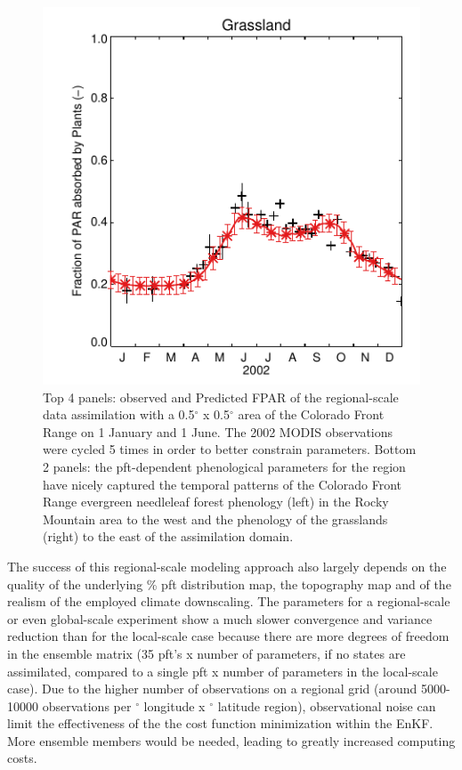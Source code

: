\documentclass[a4paper,12pt]{article}
\newcommand{\degree}{$^{\circ}$ }
\begin{document}
\begin{figure}[hp]
\begin{center}
\includegraphics[scale=0.8]{GRA.FPAR.test.2002.pdf}
\caption{Top 4 panels: observed and Predicted FPAR of the regional-scale data assimilation with a 0.5\degree x 0.5\degree area of the Colorado Front Range on 1 January and 1 June. The 2002 MODIS observations were cycled 5 times in order to better constrain parameters. Bottom 2 panels: the pft-dependent phenological parameters for the region have nicely captured the temporal patterns of the Colorado Front Range evergreen needleleaf forest phenology (left) in the Rocky Mountain area to the west and the phenology of the grasslands (right) to the east of the assimilation domain.}
\label{figure: regional 1}
\end{center}
\end{figure}

The success of this regional-scale modeling approach also largely depends on the quality of the underlying \% pft distribution map, the topography map and of the realism of the employed climate downscaling. The parameters for a regional-scale or even global-scale experiment show a much slower convergence and variance reduction than for the local-scale case because there are more degrees of freedom in the ensemble matrix (35 pft's x number of parameters, if no states are assimilated, compared to a single pft x number of parameters in the local-scale case). Due to the higher number of observations on a regional grid (around 5000-10000 observations per \degree longitude x \degree latitude region), observational noise can limit the effectiveness of the the cost function minimization within the EnKF. More ensemble members would be needed, leading to greatly increased computing costs.\\
\end{document}

